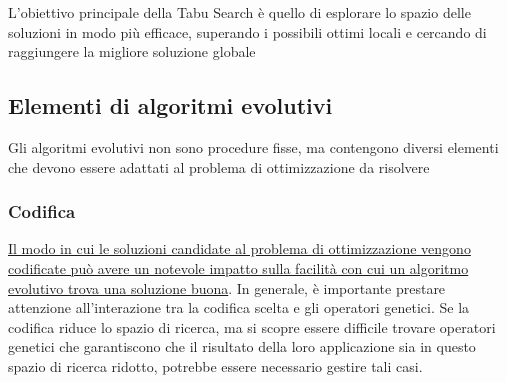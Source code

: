 L'obiettivo principale della Tabu Search è quello di esplorare lo spazio delle soluzioni in modo più efficace, superando i possibili ottimi locali e cercando di raggiungere la migliore soluzione globale

\subsection{Elementi di algoritmi evolutivi}
Gli algoritmi evolutivi non sono procedure fisse, ma contengono diversi elementi che devono essere adattati al problema di ottimizzazione da risolvere

\subsubsection{Codifica}
\uline{Il modo in cui le soluzioni candidate al problema di ottimizzazione vengono codificate può avere un notevole impatto sulla facilità con cui un algoritmo evolutivo trova una soluzione buona}. In generale, è importante prestare attenzione all'interazione tra la codifica scelta e gli operatori genetici. Se la codifica riduce lo spazio di ricerca, ma si scopre essere difficile trovare operatori genetici che garantiscono che il risultato della loro applicazione sia in questo spazio di ricerca ridotto, potrebbe essere necessario gestire tali casi.

